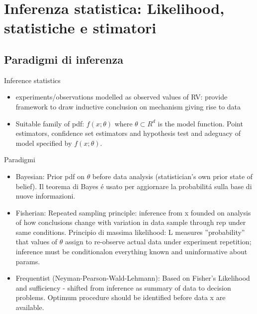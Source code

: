 \documentclass[asd-beamer.tex]{subfiles}%
\begin{document}
\section{Inferenza statistica: Likelihood, statistiche e stimatori}

\subsection{Paradigmi di inferenza}

\begin{frame}{Inference statistics}
\begin{itemize}
\item experiments/observations modelled as observed values of RV: provide framework to draw inductive conclusion on mechanism giving rise to data
\item Suitable family of pdf: $f(x;\theta)$ where $\theta\subset R^d$ is the model function. Point estimators, confidence set estimators and hypothesis test and adeguacy of model specified by $f(x;\theta)$.
\end{itemize}
\end{frame}

\begin{frame}{Paradigmi}
\begin{itemize}
\item Bayesian: Prior pdf on $\theta$ before data analysis (statistician's own prior state of belief). Il teorema di Bayes \'e usato per aggiornare la probabilit\'a sulla base di nuove informazioni.
\item Fisherian: Repeated sampling principle: inference from x founded on analysis of how conclusions change with variation in data sample through rep under same conditions. Principio di massima likelihood: L measures ''probability'' that values of $\theta$ assign to re-observe actual data under experiment repetition; inference must be conditionalon everything known and uninformative about params.
\item Frequentist (Neyman-Pearson-Wald-Lehmann): Based on Fisher's Likelihood and sufficiency - shifted from inference as summary of data to decision problems. Optimum procedure should be identified before data x are available.
\end{itemize}

\end{frame}
\end{document}
